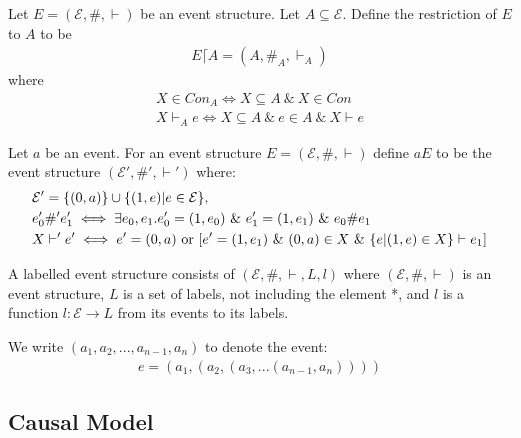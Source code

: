 \documentclass{article}
\begin{document}
\begin{definition}[Restriction]
    Let $E = (\mathcal{E},\#,\vdash)$ be an event structure.
    Let $A \subseteq \mathcal{E}$.
    Define the restriction of $E$ to $A$ to be
    \begin{align*}
        E \lceil A = (A,\#_A,\vdash_A)
    \end{align*}
    where
    \begin{align*}
        X \in Con_A \iff X \subseteq A \ \& \ X \in Con \\
        X \vdash_A e \iff X \subseteq A \ \& \ e \in A \ \& \ X \vdash e
    \end{align*}
\end{definition}

\begin{definition}
    Let $a$ be an event.
    For an event structure $E = (\mathcal{E},\#,\vdash)$ define $aE$ to be the event structure $(\mathcal{E'},\#',\vdash')$ where:
    \begin{align*}
         & \mathcal{E'} = \s{(0,a)} \cup \s{(1,e)|e \in \mathcal{E}},                                                   \\
         & e_0' \#' e_1'  \iff \exists e_0,e_1.e_0' = (1,e_0)
        \ \& \ e_1' = (1,e_1) \ \& \ e_0 \# e_1                                                                         \\
         & X \vdash' e' \iff e' = (0,a) \text{ or } [e' = (1,e_1) \ \& \ (0,a)\in X \ \& \ \s{e|(1,e)\in X} \vdash e_1]
    \end{align*}
\end{definition}

\begin{definition}
    A labelled event structure consists of $(\mathcal{E},\#,\vdash,L,l)$ where
    $(\mathcal{E},\#,\vdash)$ is an event structure, $L$ is a set of labels,
    not including the element *, and $l$ is a function $l: \mathcal{E} \rightarrow L$
    from its events to its labels.
\end{definition}
\begin{notion}
    We write $(a_1,a_2,...,a_{n-1},a_n)$ to denote the event:
    \begin{align*}
        e = (a_1,(a_2,(a_3,...(a_{n-1},a_n))))
    \end{align*}
\end{notion}

\subsection{Causal Model}
\end{document}
